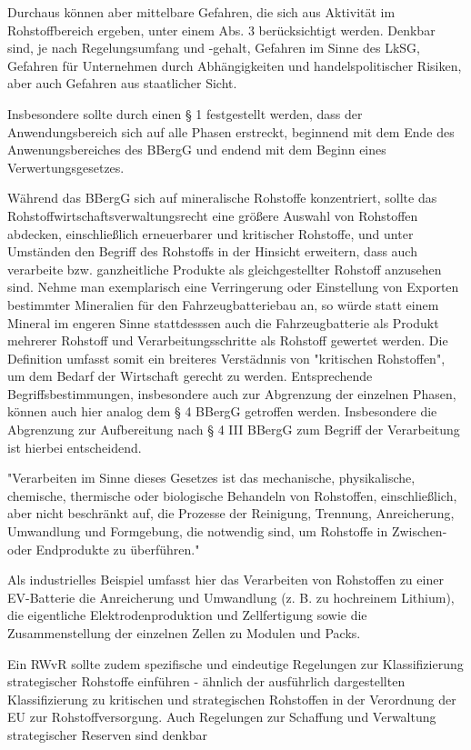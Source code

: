 Durchaus können aber mittelbare Gefahren, die sich aus Aktivität im Rohstoffbereich ergeben, unter einem Abs. 3 berücksichtigt werden. Denkbar sind, je nach Regelungsumfang und -gehalt, Gefahren im Sinne des LkSG, Gefahren für Unternehmen durch Abhängigkeiten und handelspolitischer Risiken, aber auch Gefahren aus staatlicher Sicht.

Insbesondere sollte durch einen § 1 festgestellt werden, dass der Anwendungsbereich sich auf alle Phasen erstreckt, beginnend mit dem Ende des Anwenungsbereiches des BBergG und endend mit dem Beginn eines Verwertungsgesetzes.

Während das BBergG sich auf mineralische Rohstoffe konzentriert, sollte das Rohstoffwirtschaftsverwaltungsrecht eine größere Auswahl von Rohstoffen abdecken, einschließlich erneuerbarer und kritischer Rohstoffe, und unter Umständen den Begriff des Rohstoffs in der Hinsicht erweitern, dass auch verarbeite bzw. ganzheitliche Produkte als gleichgestellter Rohstoff anzusehen sind. Nehme man exemplarisch eine Verringerung oder Einstellung von Exporten bestimmter Mineralien für den Fahrzeugbatteriebau an, so würde statt einem Mineral im engeren Sinne stattdesssen auch die Fahrzeugbatterie als Produkt mehrerer Rohstoff und Verarbeitungsschritte als Rohstoff gewertet werden. Die Definition umfasst somit ein breiteres Verstädnnis von "kritischen Rohstoffen", um dem Bedarf der Wirtschaft gerecht zu werden. Entsprechende Begriffsbestimmungen, insbesondere auch zur Abgrenzung der einzelnen Phasen, können auch hier analog dem § 4 BBergG getroffen werden. Insbesondere die Abgrenzung zur Aufbereitung nach § 4 III BBergG zum Begriff der Verarbeitung ist hierbei entscheidend.

"Verarbeiten im Sinne dieses Gesetzes ist das mechanische, physikalische, chemische, thermische oder biologische Behandeln von Rohstoffen, einschließlich, aber nicht beschränkt auf, die Prozesse der Reinigung, Trennung, Anreicherung, Umwandlung und Formgebung, die notwendig sind, um Rohstoffe in Zwischen- oder Endprodukte zu überführen."

Als industrielles Beispiel umfasst hier das Verarbeiten von Rohstoffen zu einer EV-Batterie die Anreicherung und Umwandlung (z. B. zu hochreinem Lithium), die eigentliche Elektrodenproduktion und Zellfertigung sowie die Zusammenstellung der einzelnen Zellen zu Modulen und Packs.

Ein RWvR sollte zudem spezifische und eindeutige Regelungen zur Klassifizierung strategischer Rohstoffe einführen - ähnlich der ausführlich dargestellten Klassifizierung zu kritischen und strategischen Rohstoffen in der Verordnung der EU zur Rohstoffversorgung. Auch Regelungen zur Schaffung und Verwaltung strategischer Reserven sind denkbar  %

